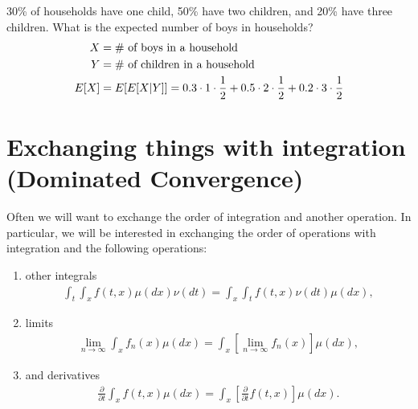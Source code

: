 \documentclass[twoside]{article}
\begin{document}
\begin{example}
30\% of households have one child, 50\% have two children, and 20\% have
three children. What is the expected number of boys in households?
\begin{align*}
  X &= \text{\# of boys in a household} \\
  Y &= \text{\# of children in a household} \\
  E[X] &= E[E[X | Y]]= 0.3 \cdot 1 \cdot \frac{1}{2} + 0.5 \cdot 2 \cdot 
  \frac{1}{2} + 0.2 \cdot 3 \cdot \frac{1}{2}
\end{align*}
\end{example}

\section{Exchanging things with integration (Dominated Convergence)}

Often we will want to exchange the order of integration and another operation.
In particular, we will be interested in exchanging the order of operations with
integration and the following operations:
\begin{enumerate}
  \item other integrals
    \begin{align*}
      \int_t \int_x f(t, x) \mu(dx) \nu(dt) = \int_x \int_t f(t, x) \nu(dt) \mu(dx),
    \end{align*}
  \item limits
    \begin{align*}
      \lim_{n \rightarrow \infty} \int_x f_n(x) \mu(dx) = \int_x \left[
    \lim_{n \rightarrow \infty} f_n(x) \right] \mu(dx),
    \end{align*}
  \item and derivatives
    \begin{align*}
      \frac{\partial}{\partial t} \int_x f(t, x) \mu(dx) = \int_x
    \left[\frac{\partial}{\partial t} f(t, x)\right] \mu(dx).
    \end{align*}
\end{enumerate}
\end{document}
